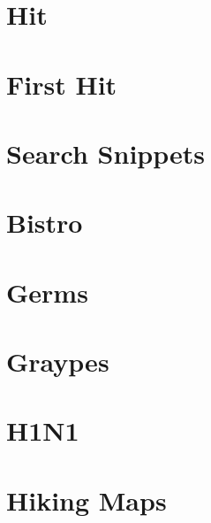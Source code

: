 \documentclass[a4paper, 10pt]{article}
\let\stdsection\section
\renewcommand\section{\newpage\stdsection}
\newcommand{\includecode}[1]{
    }
\newcommand{\algoAuthor}{2} %
\begin{document}
    \section{Hit}
        \label{sec:hit}
        \includecode{../problems/w06/Hit/Hit\algoAuthor.cpp}
        
    \section{First Hit}
        \label{sec:first_hit}
        \includecode{../problems/w06/FirstHit/FirstHit\algoAuthor.cpp}
    
    \section{Search Snippets}
        \label{sec:search_snippets}
        \includecode{../problems/w06/Search_Snippets/SearchSnippets\algoAuthor.cpp}
              
    
    \section{Bistro}
        \label{sec:bistro}
        \includecode{../problems/w07/Bistro/Bistro\algoAuthor.cpp}
        
    \section{Germs}
        \label{sec:germs}
        \includecode{../problems/w07/Germs/Germs\algoAuthor.cpp}
        
    \section{Graypes}
        \label{sec:graypes}
        \includecode{../problems/w07/Graypes/Graypes\algoAuthor.cpp}
        
    \section{H1N1}
        \label{sec:h1n1}
        \includecode{../problems/w07/H1N1/H1N1_\algoAuthor.cpp}
    
    \section{Hiking Maps}
        \label{sec:hiking_maps}
        \includecode{../problems/w07/HikingMaps/HikingMaps\algoAuthor.cpp}
    
\end{document}
